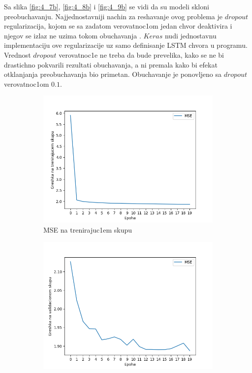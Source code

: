\documentclass[a4paper, openany, oneside, 11pt]{book}
\begin{document}
Sa slika \ref{fig:4_7b}, \ref{fig:4_8b} i \ref{fig:4_9b} se vidi da su modeli skloni preobuchavanju. Najjednostavniji nachin za reshavanje ovog problema je $dropout$ regularizacija, kojom se sa zadatom verovatnoc1om jedan chvor deaktivira i njegov se izlaz ne uzima tokom obuchavanja \cite{dropout}. $Keras$ nudi jednostavnu implementaciju ove regularizacije uz samo definisanje \acrshort{LSTM} chvora u programu. Vrednost $dropout$ verovatnoc1e ne treba da bude prevelika, kako se ne bi drastichno pokvarili rezultati obuchavanja, a ni premala kako bi efekat otklanjanja preobuchavanja bio primetan. Obuchavanje je ponovljeno sa $dropout$ verovatnoc1om $0.1$.
\newpage
\begin{figure}[!h]
        \centering
        \begin{subfigure}{0.475\textwidth}
            \centering
            \includegraphics[scale=0.43]{res/SL_BLSTM_30units_d01_train.png}
            \caption{\acrshort{MSE} na trenirajuc1em skupu}
            \label{fig:4_11a}
            \vspace{0pt}
        \end{subfigure}%
        \begin{subfigure}{0.475\textwidth}
            \centering
            \includegraphics[scale=0.43]{res/SL_BLSTM_30units_d01_validation.png}

\end{subfigure}
\end{figure}
\end{document}
